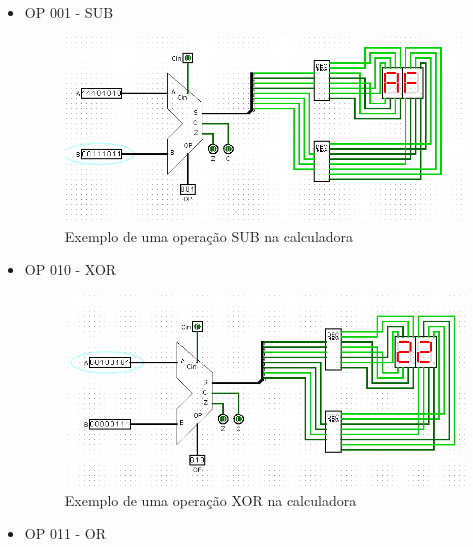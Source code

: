 \documentclass[
	12pt,				%
	openright,			%
	twoside,			%
	a4paper,			%
	english,			%
	french,				%
	spanish,			%
	brazil,				%
	]{abntex2}
\begin{document}
\begin{apendicesenv}
\begin{itemize}
\item{OP 001 - SUB}

\begin{figure}[H]
	\begin{center}
	    \includegraphics[scale=0.55]{imagens/calc001sub.png}
	\end{center}
\caption{\label{calc001sub}Exemplo de uma operação SUB na calculadora}
\end{figure}

\newpage
\item{OP 010 - XOR}

\begin{figure}[H]
	\begin{center}
	    \includegraphics[scale=0.55]{imagens/calc010xor.png}
	\end{center}
\caption{\label{calc010xor}Exemplo de uma operação XOR na calculadora}
\end{figure}

\item{OP 011 - OR}


\end{itemize}
\end{apendicesenv}
\end{document}
